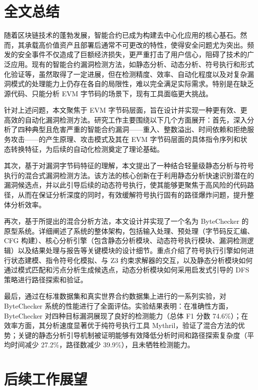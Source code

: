 \documentclass[print, master, vlined, timesmath]{DissertUESTC}
\begin{document}
\section{全文总结}

随着区块链技术的蓬勃发展，智能合约已成为构建去中心化应用的核心基石。然而，其承载高价值资产且部署后通常不可更改的特性，使得安全问题尤为突出。频发的安全事件不仅造成了巨额经济损失，更严重打击了用户信心，阻碍了技术的广泛应用。现有的智能合约漏洞检测方法，如静态分析、动态分析、符号执行和形式化验证等，虽然取得了一定进展，但在检测精度、效率、自动化程度以及对复杂漏洞模式的处理能力上仍存在各自的局限性，难以完全满足实际需求。特别是在缺乏源代码、只能分析 EVM 字节码的场景下，现有工具面临更大挑战。

针对上述问题，本文聚焦于 EVM 字节码层面，旨在设计并实现一种更有效、更高效的自动化漏洞检测方法。研究工作主要围绕以下几个方面展开：首先，深入分析了四种典型且危害严重的智能合约漏洞——重入、整数溢出、时间依赖和拒绝服务攻击——的产生原理、攻击模式及其在 EVM 字节码层面的具体指令序列和状态转换特征，为后续的自动化检测奠定了理论基础。

其次，基于对漏洞字节码特征的理解，本文提出了一种结合轻量级静态分析与符号执行的混合式漏洞检测方法。该方法的核心创新在于利用静态分析快速识别潜在的漏洞候选点，并以此引导后续的动态符号执行，使其能够更聚焦于高风险的代码路径，从而在保证分析深度的同时，有效缓解符号执行固有的路径爆炸问题，提升整体分析效率。

再次，基于所提出的混合分析方法，本文设计并实现了一个名为 ByteChecker 的原型系统。详细阐述了系统的整体架构，包括输入处理、预处理（字节码反汇编、CFG 构建）、核心分析引擎（包含静态分析模块、动态符号执行模块、漏洞检测逻辑）以及结果处理与报告等关键模块的设计细节。重点介绍了符号执行引擎如何进行状态建模、指令符号化模拟、与 Z3 约束求解器的交互，以及静态分析模块如何通过模式匹配和污点分析生成候选点，动态分析模块如何采用启发式引导的 DFS 策略进行路径探索和验证。

最后，通过在标准数据集和真实世界合约数据集上进行的一系列实验，对 ByteChecker 系统的性能进行了全面评估。实验结果表明：在准确性方面，ByteChecker 对四种目标漏洞展现了良好的检测能力（总体 F1 分数 74.6\%）；在效率方面，其分析速度显著优于纯符号执行工具 Mythril，验证了混合方法的优势；关键的静态分析引导机制被证明能够有效降低分析时间和路径探索复杂度（平均时间减少 27.2\%，路径数减少 39.9\%），且未牺牲检测能力。

\section{后续工作展望}
\end{document}
